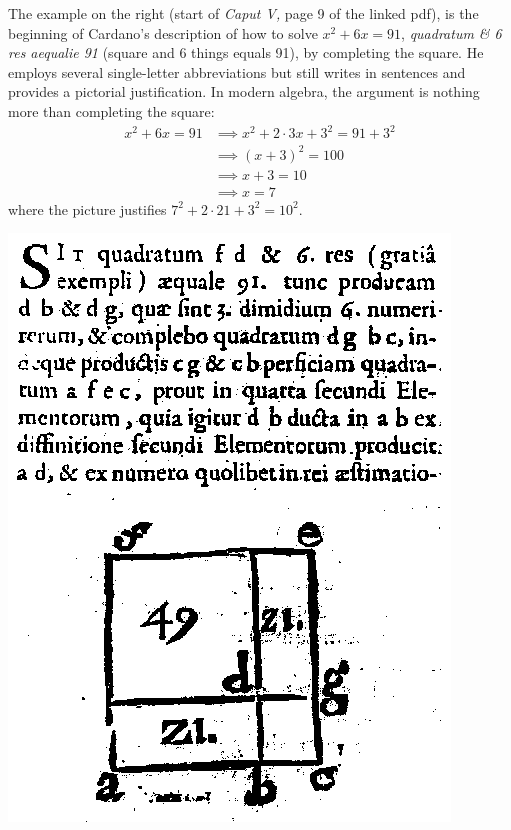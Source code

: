 \begin{minipage}[t]{0.65\linewidth}\vspace{0pt}
	The example on the right (start of \emph{Caput V,} page 9 of the linked pdf), is the beginning of Cardano's description of how to solve $x^2+6x=91$, \emph{quadratum \& 6 res aequalie 91} (square and 6 things equals 91), by completing the square. He employs several single-letter abbreviations but still writes in sentences and provides a pictorial justification. In modern algebra, the argument is nothing more than completing the square:
	\begin{align*}
		x^2+6x=91&\implies x^2+2\cdot 3x+3^2=91+3^2\\
		&\implies (x+3)^2=100\\
		&\implies x+3=10\\
		&\implies x=7
	\end{align*}
	where the picture justifies $7^2+2\cdot 21+3^2=10^2$.
\end{minipage}
\hfill
\begin{minipage}[t]{0.32\linewidth}\vspace{-2pt}
	\flushright\includegraphics[width=\linewidth]{cardano-quad}
\end{minipage}
\goodbreak


